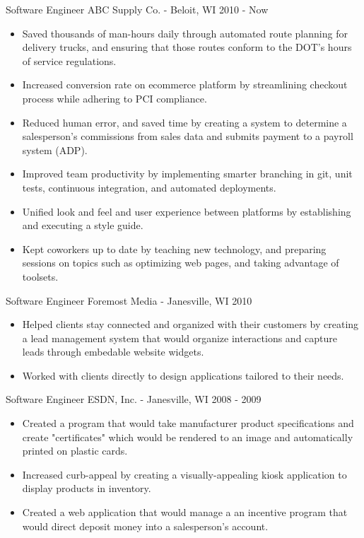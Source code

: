 \documentclass[]{clean-resume}
\begin{document}
\entry
	{Software Engineer}
	{ABC Supply Co. - Beloit, WI}
	{2010 - Now}
	{
		\begin{itemize}
			\item Saved thousands of man-hours daily through automated route planning for delivery trucks, and ensuring that those routes conform to the DOT's hours of service regulations.
		
			\item Increased conversion rate on ecommerce platform by streamlining checkout process while adhering to PCI compliance.
			
			\item Reduced human error, and saved time by creating a system to determine a salesperson's commissions from sales data and submits payment to a payroll system (ADP).
		
			\item Improved team productivity by implementing smarter branching in git, unit tests, continuous integration, and automated deployments.
		
			\item Unified look and feel and user experience between platforms by establishing and executing a style guide.
		
			\item Kept coworkers up to date by teaching new technology, and preparing sessions on topics such as optimizing web pages, and taking advantage of toolsets.
		\end{itemize}
		
	}

\entry
	{Software Engineer}
	{Foremost Media - Janesville, WI}
	{2010}
	{
		\begin{itemize}
			\item Helped clients stay connected and organized with their customers by creating a lead management system that would organize interactions and capture leads through embedable website widgets.
			\item Worked with clients directly to design applications tailored to their needs.
		\end{itemize}
		
	}
	
\entry
	{Software Engineer}
	{ESDN, Inc. - Janesville, WI}
	{2008 - 2009}
	{
		\begin{itemize}
			\item Created a program that would take manufacturer product specifications and create "certificates" which would be rendered to an image and automatically printed on plastic cards.
			\item Increased curb-appeal by creating a visually-appealing kiosk application to display products in inventory.
			\item Created a web application that would manage a an incentive program that would direct deposit money into a salesperson's account.
		\end{itemize}
		
	}
\end{document}
